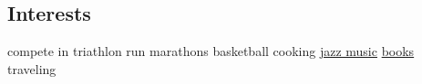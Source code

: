 \begin{aside}
\section{\normalfont Interests}
compete in triathlon 
run marathons
basketball
cooking
 \hspace{0.02cm} \href{https://open.spotify.com/playlist/3FU39afuJQ9EGzF7SDDUQ8?si=0TY3q524RxW042HSjm-bhQ}{jazz music}
 \hspace{0.02cm} \href{https://www.goodreads.com/review/list/70309779?ref=nav_mybooks}{books}
traveling
~
\end{aside}

\vspace{-0.6cm}

\vspace{-.27cm}
